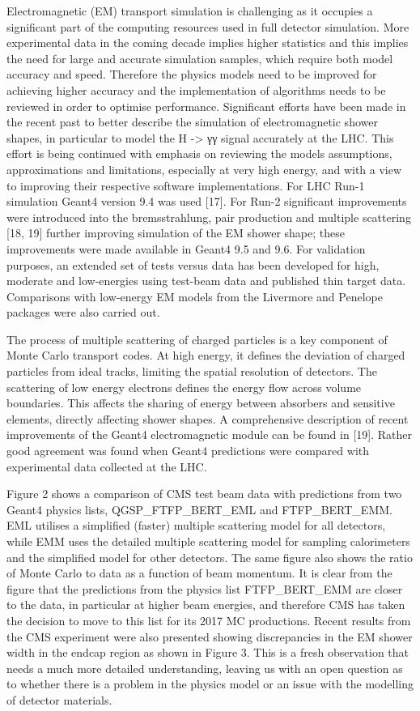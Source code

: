 \documentclass[12pt,a4paper]{article}
\begin{document}
Electromagnetic (EM) transport simulation is challenging as it occupies
a significant part of the computing resources used in full detector
simulation. More experimental data in the coming decade implies higher
statistics and this implies the need for large and accurate simulation
samples, which require both model accuracy and speed. Therefore the
physics models need to be improved for achieving higher accuracy and the
implementation of algorithms needs to be reviewed in order to optimise
performance. Significant efforts have been made in the recent past to
better describe the simulation of electromagnetic shower shapes, in
particular to model the H -\textgreater{} γγ signal accurately at the
LHC. This effort is being continued with emphasis on reviewing the
models assumptions, approximations and limitations, especially at very
high energy, and with a view to improving their respective software
implementations. For LHC Run-1 simulation Geant4 version 9.4 was used
{[}17{]}. For Run-2 significant improvements were introduced into the
bremsstrahlung, pair production and multiple scattering {[}18, 19{]}
further improving simulation of the EM shower shape; these improvements
were made available in Geant4 9.5 and 9.6. For validation purposes, an
extended set of tests versus data has been developed for high, moderate
and low-energies using test-beam data and published thin target data.
Comparisons with low-energy EM models from the Livermore and Penelope
packages were also carried out.

The process of multiple scattering of charged particles is a key
component of Monte Carlo transport codes. At high energy, it defines the
deviation of charged particles from ideal tracks, limiting the spatial
resolution of detectors. The scattering of low energy electrons defines
the energy flow across volume boundaries. This affects the sharing of
energy between absorbers and sensitive elements, directly affecting
shower shapes. A comprehensive description of recent improvements of the
Geant4 electromagnetic module can be found in {[}19{]}. Rather good
agreement was found when Geant4 predictions were compared with
experimental data collected at the LHC.

Figure 2 shows a comparison of CMS test beam data with predictions from
two Geant4 physics lists, QGSP\_FTFP\_BERT\_EML and FTFP\_BERT\_EMM. EML
utilises a simplified (faster) multiple scattering model for all
detectors, while EMM uses the detailed multiple scattering model for
sampling calorimeters and the simplified model for other detectors. The
same figure also shows the ratio of Monte Carlo to data as a function of
beam momentum. It is clear from the figure that the predictions from the
physics list FTFP\_BERT\_EMM are closer to the data, in particular at
higher beam energies, and therefore CMS has taken the decision to move
to this list for its 2017 MC productions. Recent results from the CMS
experiment were also presented showing discrepancies in the EM shower
width in the endcap region as shown in Figure 3. This is a fresh
observation that needs a much more detailed understanding, leaving us
with an open question as to whether there is a problem in the physics
model or an issue with the modelling of detector materials.
\end{document}
